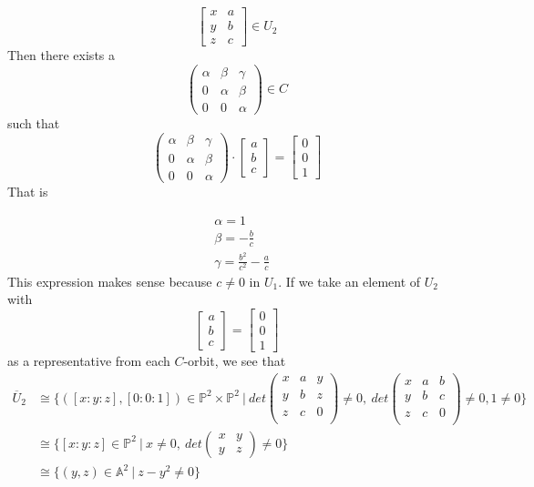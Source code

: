 \begin{example}
\[
	\begin{bmatrix}
	x&a\\
	y&b\\
	z&c
	\end{bmatrix}
	\in U_2
\]
Then there exists a 
\[
	\begin{pmatrix}
		\alpha & \beta & \gamma \\
		0 & \alpha & \beta \\
		0 & 0 & \alpha	
	\end{pmatrix}
	\in
	C
\]
such that
\[
	\begin{pmatrix}
		\alpha & \beta & \gamma \\
		0 & \alpha & \beta \\
		0 & 0 & \alpha	
	\end{pmatrix}
	\cdot
	\begin{bmatrix}
		a\\
		b\\
		c
	\end{bmatrix}
	=
	\begin{bmatrix}
		0\\
		0\\
		1
	\end{bmatrix}	
\] 
That is 

	\begin{align*}
		&\alpha=1\\
		&\beta=-\frac{b}{c}\\
		&\gamma=\frac{b^2}{c^2}-\frac{a}{c}
	\end{align*}
This expression makes sense because $c\neq 0$ in $U_1$.
If we take an element of $U_2$ with 
\[
	\begin{bmatrix}
		a\\
		b\\
		c
	\end{bmatrix}
	=
	\begin{bmatrix}
		0\\
		0\\
		1
	\end{bmatrix}	
\]
as a representative from each $C$-orbit, we see that 
\begin{align*}
	\overline{U}_2
	&\cong
	\{
	([x:y:z],[0:0:1])\in \mathbb{P}^2 \times \mathbb{P}^2~|~
	det	
	\begin{pmatrix}
	x&a&y\\
	y&b&z\\
	z&c&0\\
	\end{pmatrix}
	\neq 0,~
	det	
	\begin{pmatrix}
	x&a&b\\
	y&b&c\\
	z&c&0\\
	\end{pmatrix}
	\neq 0,
	1\neq 0	 	
	\}\\
	&\cong
	\{
	[x:y:z]\in \mathbb{P}^2~|~
	x\neq 0,~
	det	
	\begin{pmatrix}
	x&y\\
	y&z
	\end{pmatrix}
	\neq 0	 	
	\}\\
	&\cong
	\{
	(y,z)\in \mathbb{A}^2~|~
	z-y^2\neq 0 	
	\}	
\end{align*}


\end{example}
